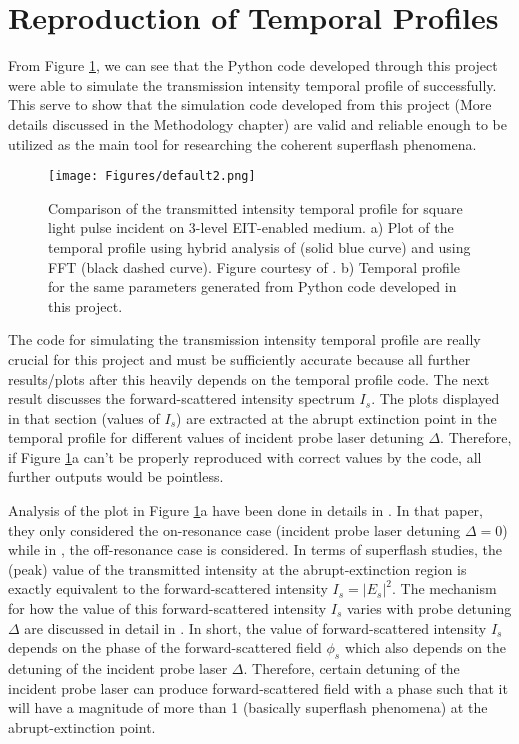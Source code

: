 \section{Reproduction of Temporal Profiles}
From Figure \ref{fig: comparing temporal profile 1}, we can see that the Python code developed through this project were able to simulate the transmission intensity temporal profile of  successfully. This serve to show that the simulation code developed from this project (More details discussed in the Methodology chapter) are valid and reliable enough to be utilized as the main tool for researching the coherent superflash phenomena.

\begin{figure}
    \centering
    \texttt{[image: Figures/default2.png]}
    \caption[Comparison of Transmitted Intensity Temporal Profile From \protect\cite{jeong2010slow} and This Project's Simulation]{Comparison of the transmitted intensity temporal profile for square light pulse incident on 3-level EIT-enabled medium. a) Plot of the temporal profile using hybrid analysis of \protect\cite{jeong2010slow} (solid blue curve) and using FFT (black dashed curve). Figure courtesy of \protect\cite{jeong2010slow}. b) Temporal profile for the same parameters generated from Python code developed in this project.}
    \label{fig: comparing temporal profile 1}
\end{figure}

The code for simulating the transmission intensity temporal profile are really crucial for this project and must be sufficiently accurate because all further results/plots after this heavily depends on the temporal profile code. The next result discusses the forward-scattered intensity spectrum $I_{s}$. The plots displayed in that section (values of $I_{s}$) are extracted at the abrupt extinction point in the temporal profile for different values of incident probe laser detuning $\Delta$. Therefore, if Figure \ref{fig: comparing temporal profile 1}a can't be properly reproduced with correct values by the code, all further outputs would be pointless.

Analysis of the plot in Figure \ref{fig: comparing temporal profile 1}a have been done in details in . In that paper, they only considered the on-resonance case (incident probe laser detuning $\Delta = 0$) while in , the off-resonance case is considered. In terms of superflash studies, the (peak) value of the transmitted intensity at the abrupt-extinction region is exactly equivalent to the forward-scattered intensity $I_{s} = |E_{s}|^{2}$. The mechanism for how the value of this forward-scattered intensity $I_{s}$ varies with probe detuning $\Delta$ are discussed in detail in . In short, the value of forward-scattered intensity $I_{s}$ depends on the phase of the forward-scattered field $\phi_{s}$ which also depends on the detuning of the incident probe laser $\Delta$. Therefore, certain detuning of the incident probe laser can produce forward-scattered field with a phase such that it will have a magnitude of more than 1 (basically superflash phenomena) at the abrupt-extinction point.

